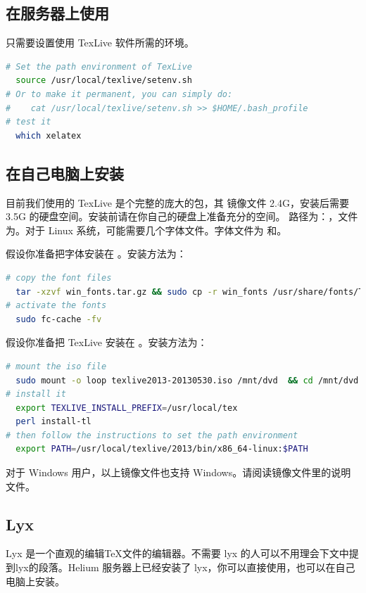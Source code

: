 \subsection{在服务器上使用}
只需要设置使用 TexLive 软件所需的环境。
\begin{lstlisting}[language=sh,caption={在服务器上设置使用 TexLive 的环境}]
# Set the path environment of TexLive 
  source /usr/local/texlive/setenv.sh
# Or to make it permanent, you can simply do:
#    cat /usr/local/texlive/setenv.sh >> $HOME/.bash_profile
# test it
  which xelatex
\end{lstlisting}

\subsection{在自己电脑上安装}
目前我们使用的 TexLive 是个完整的庞大的包，其  镜像文件 2.4G，安装后需要 3.5G 的硬盘空间。安装前请在你自己的硬盘上准备充分的空间。
路径为：，文件为。对于 Linux 系统，可能需要几个字体文件。字体文件为 和。

假设你准备把字体安装在 。安装方法为：
\begin{lstlisting}[language=sh,caption={安装字体}]
# copy the font files
  tar -xzvf win_fonts.tar.gz && sudo cp -r win_fonts /usr/share/fonts/TTF/
# activate the fonts
  sudo fc-cache -fv
\end{lstlisting}

假设你准备把 TexLive 安装在  。安装方法为：
\begin{lstlisting}[language=sh,caption={安装 TexLive}]
# mount the iso file
  sudo mount -o loop texlive2013-20130530.iso /mnt/dvd  && cd /mnt/dvd
# install it
  export TEXLIVE_INSTALL_PREFIX=/usr/local/tex
  perl install-tl
# then follow the instructions to set the path environment
  export PATH=/usr/local/texlive/2013/bin/x86_64-linux:$PATH
\end{lstlisting}

对于 Windows 用户，以上镜像文件也支持 Windows。请阅读镜像文件里的说明文件。

\subsection{Lyx}
Lyx 是一个直观的编辑\TeX 文件的编辑器。不需要 lyx 的人可以不用理会下文中提到lyx的段落。Helium 服务器上已经安装了 lyx，你可以直接使用，也可以在自己电脑上安装。

